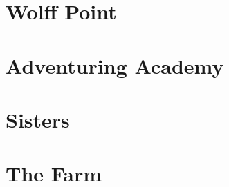 

\begin{multicols}{2}

\section{Wolff Point}


\section{Adventuring Academy}


\section{Sisters}


\section{The Farm}


\end{multicols}
